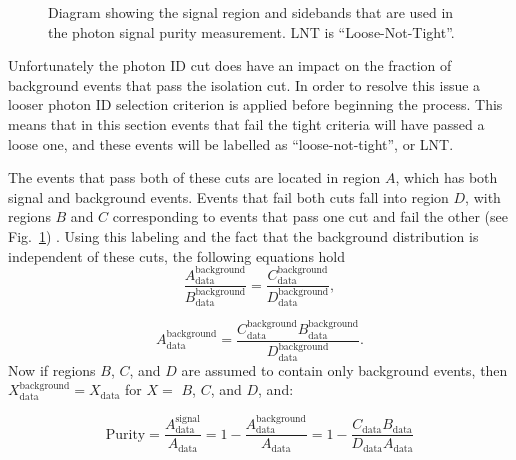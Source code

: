 \begin{figure}[!ht]
\begin{center}
\end{center}
\caption[Sideband method]
{\small Diagram showing the signal region and sidebands that are used in the photon signal purity measurement.  LNT is ``Loose-Not-Tight''.  }
\label{ABCD}
\end{figure}

Unfortunately the photon ID cut does have an impact on the fraction of background events that pass the isolation cut.  
In order to resolve this issue a looser photon ID selection criterion is applied before beginning the process.  
This means that in this section events that fail the tight criteria will have passed a loose one, and these events will be labelled as ``loose-not-tight'', or LNT.  

The events that pass both of these cuts are located in region $A$, which has both signal and background events.
Events that fail both cuts fall into region $D$, with regions $B$ and $C$ corresponding to events that pass one cut and fail the other (see Fig.~\ref{ABCD}) .   
Using this labeling and the fact that the background distribution is independent of these cuts, the following equations hold
\begin{equation}
 \frac{A_{\mathrm{data}}^{\mathrm{background}}}{B_{\mathrm{data}}^{\mathrm{background}}} = \frac{C_{\mathrm{data}}^{\mathrm{background}}}{D_{\mathrm{data}}^{\mathrm{background}}},
\end{equation}

\begin{equation}
 A_{\mathrm{data}}^{\mathrm{background}} =  \frac{C_{\mathrm{data}}^{\mathrm{background}}B_{\mathrm {data}}^{\mathrm{background}}}{D_{\mathrm {data}}^{\mathrm{background}}}. 
\end{equation}
\noindent 
Now if regions $B$, $C$, and $D$ are assumed to contain only background events, then $X_{\mathrm{data}}^{\mathrm{background}}=X_{\mathrm{data}}$ for $X=$ $B$, $C$, and $D$, and:

\begin{equation}
 \label{eq:PureSimple}
 \mathrm{Purity} = \frac{A_{\mathrm{data}}^{\mathrm{signal}}}{A_{\mathrm{data}}} = 1-\frac{A_{\mathrm{data}}^{\mathrm{background}}}{A_{\mathrm{data}}} =1- \frac{C_{\mathrm{data}}B_{\mathrm{data}}}{D_{\mathrm {data}}A_{\mathrm {data}}}
\end{equation}
\noindent

